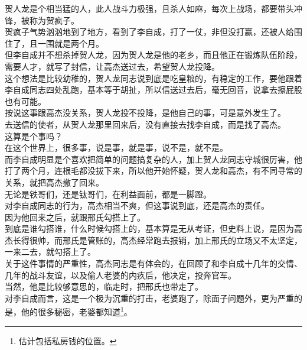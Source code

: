\begin{multicols}{\theparacolNo}
贺人龙是个相当猛的人，此人战斗力极强，且杀人如麻，每次上战场，都要带头冲锋，被称为贺疯子。\\

贺疯子气势汹汹地到了地方，看到了李自成，打了一仗，非但没打赢，还被人给围住了，且一围就是两个月。\\

但李自成并不想杀掉贺人龙，因为贺人龙是他的老乡，而且他正在锻炼队伍阶段，需要人才，就写了封信，让高杰送过去，希望贺人龙投降。\\

这个想法是比较幼稚的，贺人龙同志说到底是吃皇粮的，有稳定的工作，要他跟着李自成同志四处乱跑，基本等于胡扯，所以信送过去后，毫无回音，说拿去擦屁股也有可能。\\

按说这事跟高杰没关系，贺人龙投不投降，是他自己的事，可是意外发生了。\\

去送信的使者，从贺人龙那里回来后，没有直接去找李自成，而是找了高杰。\\

这算是个事吗？\\

在这个世界上，很多事，说是事，就是事，说不是，就不是。\\

而李自成明显是个喜欢把简单的问题搞复杂的人，加上贺人龙同志守城很厉害，他打了两个月，连根毛都没拔下来，所以他开始怀疑，贺人龙和高杰，有不同寻常的关系，就把高杰撤了回来。\\

无论是铁哥们，还是钛哥们，在利益面前，都是一脚蹬。\\

对李自成同志的行为，高杰相当不爽，但这事说到底，还是高杰的责任。\\

因为他回来之后，就跟邢氏勾搭上了。\\

到底是谁勾搭谁，什么时候勾搭上的，基本算是无从考证，但史料上说，是因为高杰长得很帅，而邢氏是管账的，高杰经常跑去报销，加上邢氏的立场又不太坚定，一来二去，就勾搭上了。\\

关于这件事情的严重性，高杰同志是有体会的，在回顾了和李自成十几年的交情、几年的战斗友谊，以及偷人老婆的内疚后，他决定，投奔官军。\\

当然，他是比较够意思的，临走时，把邢氏也带走了。\\

对李自成而言，这是一个极为沉重的打击，老婆跑了，除面子问题外，更为严重的是，他的很多秘密，老婆都知道\footnote{估计包括私房钱的位置。}。\\


\end{multicols}

